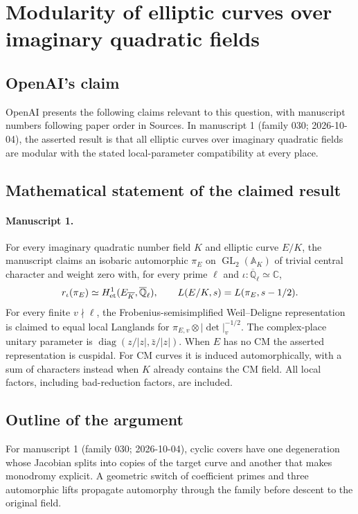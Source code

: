\documentclass[11pt]{article}
\begin{document}
\section*{Modularity of elliptic curves over imaginary quadratic fields}

\subsection{OpenAI's claim}
OpenAI presents the following claims relevant to this question, with manuscript numbers following paper order in Sources. In manuscript 1 (family 030; 2026-10-04), the asserted result is that all elliptic curves over imaginary quadratic fields are modular with the stated local-parameter compatibility at every place.

\subsection{Mathematical statement of the claimed result}
\paragraph{Manuscript 1.}
For every imaginary quadratic number field $K$ and elliptic curve $E/K$, the manuscript claims an isobaric automorphic $\pi_E$ on $\operatorname{GL}_2(\mathbb A_K)$ of trivial central character and weight zero with, for every prime $\ell$ and $\iota:\overline{\mathbb Q}_{\ell}\simeq\mathbb C$,
\[
 r_{\iota}(\pi_E)\simeq H^1_{\rm et}(E_{\overline K},\overline{\mathbb Q}_{\ell}),\qquad
 L(E/K,s)=L(\pi_E,s-1/2).
\]
For every finite $v\nmid\ell$, the Frobenius-semisimplified Weil--Deligne representation is claimed to equal local Langlands for $\pi_{E,v}\otimes|\det|_v^{-1/2}$. The complex-place unitary parameter is $\operatorname{diag}(z/|z|,\bar z/|z|)$. When $E$ has no CM the asserted representation is cuspidal. For CM curves it is induced automorphically, with a sum of characters instead when $K$ already contains the CM field. All local factors, including bad-reduction factors, are included.

\subsection{Outline of the argument}
For manuscript 1 (family 030; 2026-10-04), cyclic covers have one degeneration whose Jacobian splits into copies of the target curve and another that makes monodromy explicit. A geometric switch of coefficient primes and three automorphic lifts propagate automorphy through the family before descent to the original field.
\end{document}
